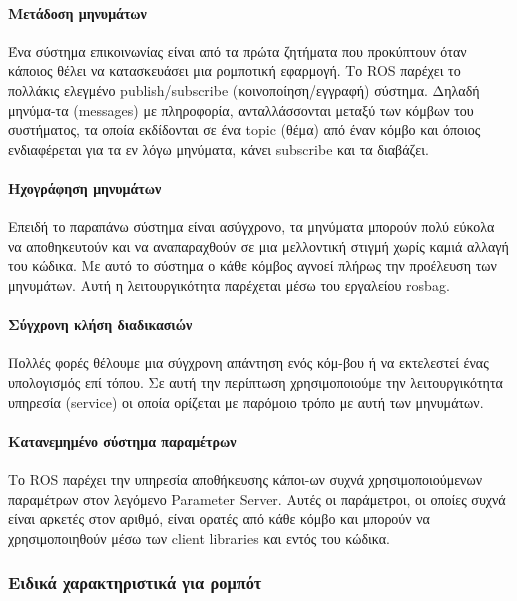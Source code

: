 \paragraph{Μετάδοση μηνυμάτων} 
Ένα σύστημα επικοινωνίας είναι από τα πρώτα ζητήματα που προκύπτουν όταν κάποιος\hspace{0.07 cm} θέλει να κατασκευάσει μια ρομποτική εφαρμογή. Το ROS παρέχει το πολλάκις\hspace{0.07 cm} ελεγμένο publish/subscribe\hspace{0.07 cm} (κοινοποίηση/εγγραφή) σύστημα. Δηλαδή μηνύμα-τα (messages) με πληροφορία, ανταλλάσσονται μεταξύ των κόμβων του συστήματος, τα οποία εκδίδονται σε ένα topic (θέμα) από έναν κόμβο και όποιος ενδιαφέρεται για τα εν λόγω μηνύματα, κάνει subscribe και τα διαβάζει. \\   

\paragraph{Ηχογράφηση μηνυμάτων} 
Επειδή το παραπάνω σύστημα είναι ασύγχρονο, τα μηνύματα μπορούν πολύ εύκολα να αποθηκευτούν και να αναπαραχθούν σε μια μελλοντική στιγμή χωρίς καμιά αλλαγή του κώδικα. 
Mε αυτό το σύστημα ο κάθε κόμβος αγνοεί πλήρως την προέλευση των μηνυμάτων. Αυτή η λειτουργικότητα παρέχεται μέσω του εργαλείου rosbag. \\

\paragraph{Σύγχρονη κλήση διαδικασιών} 
Πολλές φορές θέλουμε μια σύγχρονη απάντηση ενός κόμ-βου ή να εκτελεστεί ένας υπολογισμός επί τόπου. Σε αυτή την περίπτωση χρησιμοποιούμε την λειτουργικότητα υπηρεσία (service) οι οποία ορίζεται με παρόμοιο τρόπο με αυτή των μηνυμάτων. \\

\paragraph{Κατανεμημένο σύστημα παραμέτρων} 
Το ROS παρέχει την υπηρεσία αποθήκευσης κάποι-ων συχνά χρησιμοποιούμενων παραμέτρων στον λεγόμενο Parameter Server. Αυτές οι παράμετροι, οι οποίες συχνά είναι αρκετές στον αριθμό, είναι ορατές από κάθε κόμβο και μπορούν να χρησιμοποιηθούν μέσω των client libraries και εντός του κώδικα. \\


\subsubsection{Ειδικά χαρακτηριστικά για ρομπότ}

